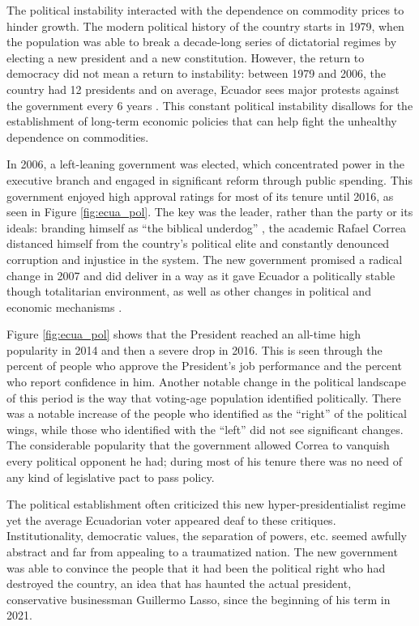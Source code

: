 \documentclass[12pt,a4]{article}
\begin{document}
The political instability interacted with the dependence on commodity prices to hinder growth. The modern political history of the country starts in 1979, when the population was able to break a decade-long series of dictatorial regimes by electing a new president and a new constitution. However, the return to democracy did not mean a return to instability: between 1979 and 2006, the country had 12 presidents and on average, Ecuador sees major protests against the government every 6 years \parencite{Loaiza.2022}. This constant political instability disallows for the establishment of long-term economic policies that can help fight the unhealthy dependence on commodities.

In 2006, a left-leaning government was elected, which concentrated power in the executive branch and engaged in significant reform through public spending. This government enjoyed high approval ratings for most of its tenure until 2016, as seen in Figure \ref{fig:ecua_pol}. The key was the leader, rather than the party or its ideals:  branding himself as \enquote{the biblical underdog} \parencite[para. 4]{Hedgecoe.2009}, the academic Rafael Correa distanced himself from the country's political elite and constantly denounced corruption and injustice in the system. The new government promised a radical change in 2007 and did deliver in a way as it gave Ecuador a politically stable though totalitarian environment, as well as other changes in political and economic mechanisms \parencite{Weisbrot.2017}. 

Figure \ref{fig:ecua_pol} shows that the President reached an all-time high popularity in 2014 and then a severe drop in 2016. This is seen through the percent of people who approve the President's job performance and the percent who report confidence in him. Another notable change in the political landscape of this period is the way that voting-age population identified politically. There was a notable increase of the people who identified as the \enquote{right} of the political wings, while those who identified with the \enquote{left} did not see significant changes. The considerable popularity that the government allowed Correa to vanquish every political opponent he had; during most of his tenure there was no need of any kind of legislative pact to pass policy.

The political establishment often criticized this new hyper-presidentialist regime yet the average Ecuadorian voter appeared deaf to these critiques. Institutionality, democratic values, the separation of powers, etc. seemed awfully abstract and far from appealing to a traumatized nation. The new government was able to convince the people that it had been the political right who had destroyed the country, an idea that has haunted the actual president, conservative businessman Guillermo Lasso, since the beginning of his term in 2021.
\end{document}
